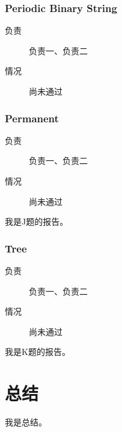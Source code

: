\documentclass[a4paper, 11pt, nofonts, nocap, fancyhdr]{ctexart}
\newcommand{\problem}[1]{\subsubsection{#1}}
\begin{document}
\problem{Periodic Binary String}

\begin{description}
\item[负责] 负责一、负责二
\item[情况] 尚未通过
\end{description}


\problem{Permanent}

\begin{description}
\item[负责] 负责一、负责二
\item[情况] 尚未通过
\end{description}

我是J题的报告。

\problem{Tree}

\begin{description}
\item[负责] 负责一、负责二
\item[情况] 尚未通过
\end{description}

我是K题的报告。

\section{总结}

我是总结。
\end{document}
